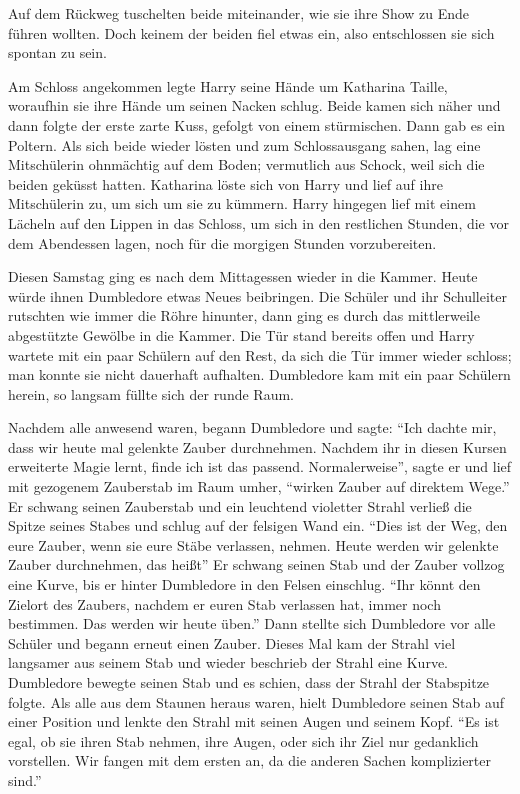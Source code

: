 Auf dem Rückweg tuschelten beide miteinander, wie sie ihre Show zu Ende führen wollten. Doch keinem der beiden fiel etwas ein, also entschlossen sie sich spontan zu sein.

Am Schloss angekommen legte Harry seine Hände um Katharina Taille, woraufhin sie ihre Hände um seinen Nacken schlug. Beide kamen sich näher und dann folgte der erste zarte Kuss, gefolgt von einem stürmischen. Dann gab es ein Poltern. Als sich beide wieder lösten und zum Schlossausgang sahen, lag eine Mitschülerin ohnmächtig auf dem Boden; vermutlich aus Schock, weil sich die beiden geküsst hatten. Katharina löste sich von Harry und lief auf ihre Mitschülerin zu, um sich um sie zu kümmern. Harry hingegen lief mit einem Lächeln auf den Lippen in das Schloss, um sich in den restlichen Stunden, die vor dem Abendessen lagen, noch für die morgigen Stunden vorzubereiten.

\trenn

Diesen Samstag ging es nach dem Mittagessen wieder in die Kammer. Heute würde ihnen Dumbledore etwas Neues beibringen. Die Schüler und ihr Schulleiter rutschten wie immer die Röhre hinunter, dann ging es durch das mittlerweile abgestützte Gewölbe in die Kammer. Die Tür stand bereits offen und Harry wartete mit ein paar Schülern auf den Rest, da sich die Tür immer wieder schloss; man konnte sie nicht dauerhaft aufhalten. Dumbledore kam mit ein paar Schülern herein, so langsam füllte sich der runde Raum.

Nachdem alle anwesend waren, begann Dumbledore und sagte: \enquote{Ich dachte mir, dass wir heute mal gelenkte Zauber durchnehmen. Nachdem ihr in diesen Kursen erweiterte Magie lernt, finde ich ist das passend. \gst Normalerweise}, sagte er und lief mit gezogenem Zauberstab im Raum umher, \enquote{wirken Zauber auf direktem Wege.} Er schwang seinen Zauberstab und ein leuchtend violetter Strahl verließ die Spitze seines Stabes und schlug auf der felsigen Wand ein. \enquote{Dies ist der Weg, den eure Zauber, wenn sie eure Stäbe verlassen, nehmen. Heute werden wir gelenkte Zauber durchnehmen, das heißt\abs} Er schwang seinen Stab und der Zauber vollzog eine Kurve, bis er hinter Dumbledore in den Felsen einschlug. \enquote{Ihr könnt den Zielort des Zaubers, nachdem er euren Stab verlassen hat, immer noch bestimmen. Das werden wir heute üben.} Dann stellte sich Dumbledore vor alle Schüler und begann erneut einen Zauber. Dieses Mal kam der Strahl viel langsamer aus seinem Stab und wieder beschrieb der Strahl eine Kurve. Dumbledore bewegte seinen Stab und es schien, dass der Strahl der Stabspitze folgte. Als alle aus dem Staunen heraus waren, hielt Dumbledore seinen Stab auf einer Position und lenkte den Strahl mit seinen Augen und seinem Kopf. \enquote{Es ist egal, ob sie ihren Stab nehmen, ihre Augen, oder sich ihr Ziel nur gedanklich vorstellen. \gst Wir fangen mit dem ersten an, da die anderen Sachen komplizierter sind.}

